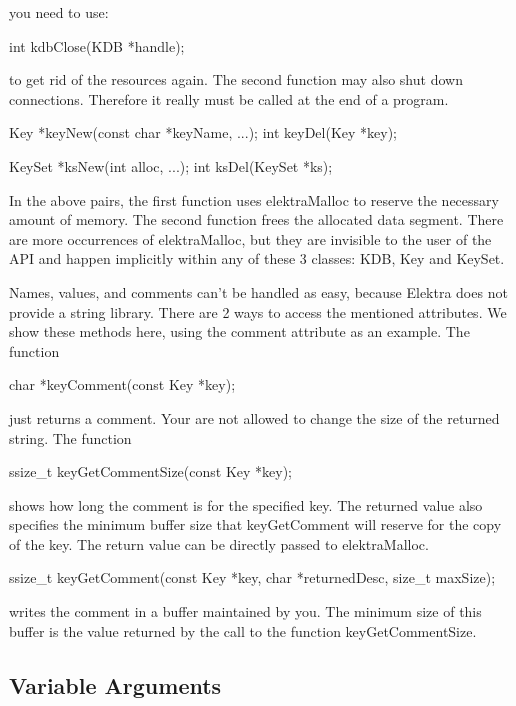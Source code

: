 you need to use\+: \begin{DoxyVerb}    int kdbClose(KDB *handle);
\end{DoxyVerb}


to get rid of the resources again. The second function may also shut down connections. Therefore it really must be called at the end of a program. \begin{DoxyVerb}    Key *keyNew(const char *keyName, ...);
    int keyDel(Key *key);

    KeySet *ksNew(int alloc, ...);
    int ksDel(KeySet *ks);
\end{DoxyVerb}


In the above pairs, the first function uses elektra\+Malloc to reserve the necessary amount of memory. The second function frees the allocated data segment. There are more occurrences of {\ttfamily elektra\+Malloc}, but they are invisible to the user of the A\+P\+I and happen implicitly within any of these 3 classes\+: {\ttfamily K\+D\+B}, {\ttfamily Key} and {\ttfamily Key\+Set}.

Names, values, and comments can't be handled as easy, because Elektra does not provide a string library. There are 2 ways to access the mentioned attributes. We show these methods here, using the comment attribute as an example. The function \begin{DoxyVerb}    char *keyComment(const Key *key);
\end{DoxyVerb}


just returns a comment. Your are not allowed to change the size of the returned string. The function \begin{DoxyVerb}    ssize_t keyGetCommentSize(const Key *key);
\end{DoxyVerb}


shows how long the comment is for the specified key. The returned value also specifies the minimum buffer size that {\ttfamily key\+Get\+Comment} will reserve for the copy of the key. The return value can be directly passed to {\ttfamily elektra\+Malloc}. \begin{DoxyVerb}    ssize_t keyGetComment(const Key *key, char *returnedDesc, size_t maxSize);
\end{DoxyVerb}


writes the comment in a buffer maintained by you. The minimum size of this buffer is the value returned by the call to the function {\ttfamily key\+Get\+Comment\+Size}.

\subsection*{Variable Arguments}


